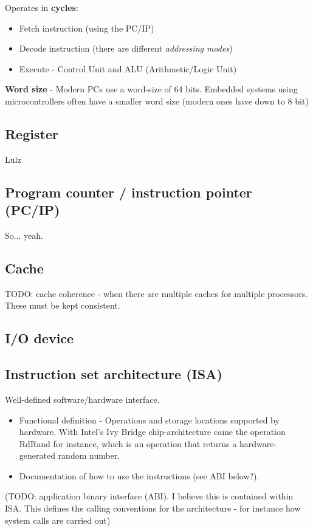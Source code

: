 \documentclass{article}
\begin{document}
Operates in \textbf{cycles}:
\begin{itemize}
	\item Fetch instruction (using the PC/IP)
	\item Decode instruction (there are different \emph{addressing modes})
	\item Execute - Control Unit and ALU (Arithmetic/Logic Unit)
\end{itemize}

\textbf{Word size} - Modern PCs use a word-size of 64 bits. Embedded systems using microcontrollers often have a smaller word size (modern ones have down to 8 bit)

\subsection*{Register}
Lulz

\subsection*{Program counter / instruction pointer (PC/IP)}
So... yeah.

\subsection*{Cache}
TODO: cache coherence - when there are multiple caches for multiple processors. These must be kept consistent.

\subsection*{I/O device}

\subsection*{Instruction set architecture (ISA)}
Well-defined software/hardware interface.

\begin{itemize}
	\item Functional definition - Operations and storage locations supported by hardware. With Intel's Ivy Bridge chip-architecture came the operation RdRand for instance, which is an operation that returns a hardware-generated random number.
	\item Documentation of how to use the instructions (see ABI below?).
\end{itemize}

(TODO: application binary interface (ABI). I believe this is contained within ISA. This defines the calling conventions for the architecture - for instance how system calls are carried out)
\end{document}
